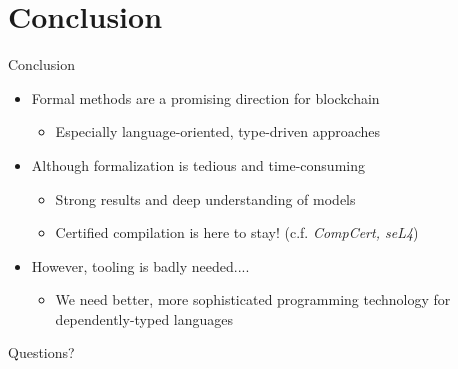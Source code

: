 \documentclass[aspectratio=169]{beamer}
\begin{document}
\section{Conclusion}
\begin{frame}{Conclusion}
\begin{itemize}
\item Formal methods are a promising direction for blockchain
  \begin{itemize}
  \item Especially language-oriented, type-driven approaches
  \end{itemize}
\item Although formalization is tedious and time-consuming
  \begin{itemize}
  \item Strong results and deep understanding of models
  \item Certified compilation is here to stay! (c.f. \textit{CompCert, seL4})
  \end{itemize}
\item However, tooling is badly needed....
  \begin{itemize}
  \item We need better, more sophisticated programming technology
    for dependently-typed languages
  \end{itemize}
\end{itemize}
\end{frame}

\begin{frame}[standout]
  Questions?
\end{frame}
\end{document}
